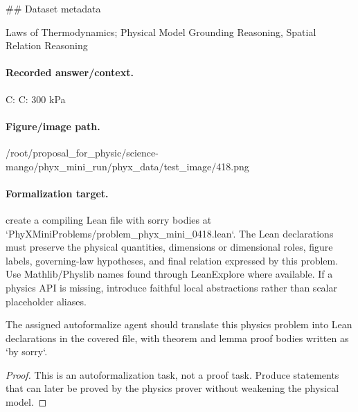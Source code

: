 \#\# Dataset metadata

Laws of Thermodynamics; Physical Model Grounding Reasoning, Spatial Relation Reasoning

\paragraph{Recorded answer/context.}
C: C: 300 kPa

\paragraph{Figure/image path.}
/root/proposal\_for\_physic/science-mango/phyx\_mini\_run/phyx\_data/test\_image/418.png

\paragraph{Formalization target.}
create a compiling Lean file with sorry bodies at `PhyXMiniProblems/problem\_phyx\_mini\_0418.lean`. The Lean declarations must preserve the physical quantities, dimensions or dimensional roles, figure labels, governing-law hypotheses, and final relation expressed by this problem.
Use Mathlib/Physlib names found through LeanExplore where available. If a physics API is missing, introduce faithful local abstractions rather than scalar placeholder aliases.

\begin{theorem}
\label{thm:physics:phyx_mini_0418:target}
The assigned autoformalize agent should translate this physics problem into Lean declarations in the covered file, with theorem and lemma proof bodies written as `by sorry`.
\end{theorem}
\begin{proof}
This is an autoformalization task, not a proof task. Produce statements that can later be proved by the physics prover without weakening the physical model.
\end{proof}

